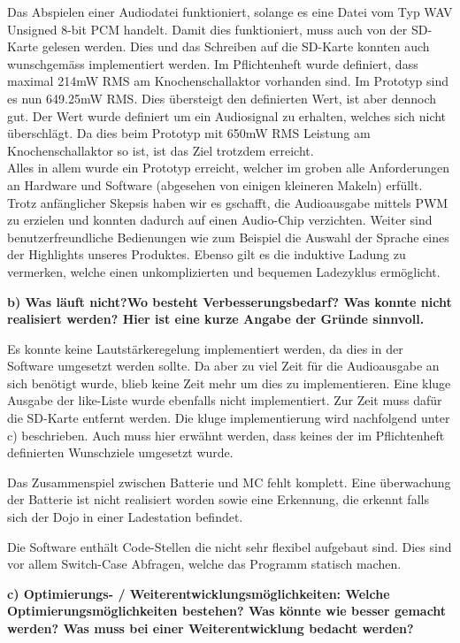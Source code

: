 Das Abspielen einer Audiodatei funktioniert, solange es eine Datei vom Typ WAV Unsigned 8-bit PCM handelt. Damit dies funktioniert, muss auch von der SD-Karte gelesen werden. Dies und das Schreiben auf die SD-Karte konnten auch wunschgemäss implementiert werden. Im Pflichtenheft wurde definiert, dass maximal 214mW RMS am Knochenschallaktor vorhanden sind. Im Prototyp sind es nun 649.25mW RMS. Dies übersteigt den definierten Wert, ist aber dennoch gut. Der Wert wurde definiert um ein Audiosignal zu erhalten, welches sich nicht überschlägt. Da dies beim Prototyp mit 650mW RMS Leistung am Knochenschallaktor so ist, ist das Ziel trotzdem erreicht. \\
 
Alles in allem wurde ein Prototyp erreicht, welcher im groben alle Anforderungen an Hardware und Software (abgesehen von einigen kleineren Makeln) erfüllt. Trotz anfänglicher Skepsis haben wir es gschafft, die Audioausgabe mittels PWM zu erzielen und konnten dadurch auf einen Audio-Chip verzichten. Weiter sind benutzerfreundliche Bedienungen wie zum Beispiel die Auswahl der Sprache eines der Highlights unseres Produktes. Ebenso gilt es die induktive Ladung zu vermerken, welche einen unkomplizierten und bequemen Ladezyklus ermöglicht.

\textbf{b) Was läuft nicht?Wo besteht Verbesserungsbedarf? Was konnte nicht realisiert werden? Hier ist eine kurze Angabe der Gründe sinnvoll.}

Es konnte keine Lautstärkeregelung implementiert werden, da dies in der Software umgesetzt werden sollte. Da aber zu viel Zeit für die Audioausgabe an sich benötigt wurde, blieb keine Zeit mehr um dies zu implementieren. Eine kluge Ausgabe der like-Liste wurde ebenfalls nicht implementiert. Zur Zeit muss dafür die SD-Karte entfernt werden. Die kluge implementierung wird nachfolgend unter c) beschrieben.  Auch muss hier erwähnt werden, dass keines der im Pflichtenheft definierten Wunschziele umgesetzt wurde.

Das Zusammenspiel zwischen Batterie und MC fehlt komplett. Eine überwachung der Batterie ist nicht realisiert worden sowie eine Erkennung, die erkennt falls sich der Dojo in einer Ladestation befindet.

Die Software enthält Code-Stellen die nicht sehr flexibel aufgebaut sind. Dies sind vor allem Switch-Case Abfragen, welche das Programm statisch machen.
 
\textbf{c) Optimierungs- / Weiterentwicklungsmöglichkeiten: Welche Optimierungsmöglichkeiten bestehen? Was könnte wie besser gemacht werden? Was muss bei einer Weiterentwicklung bedacht werden?}

